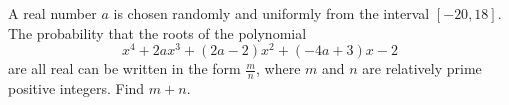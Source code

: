 A real number $a$ is chosen randomly and uniformly from the interval $[-20, 18]$. The probability that the roots of the polynomial \[x^4 + 2ax^3 + (2a-2)x^2 + (-4a+3)x - 2\]are all real can be written in the form $\tfrac{m}{n}$, where $m$ and $n$ are relatively prime positive integers. Find $m+n$.